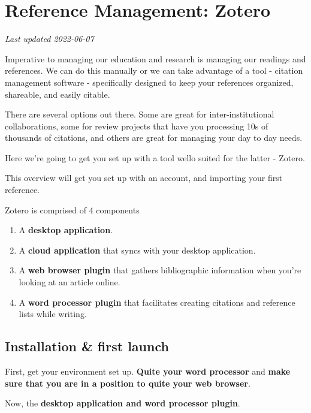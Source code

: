 \documentclass[
]{book}
\providecommand{\tightlist}{%
  \setlength{\itemsep}{0pt}\setlength{\parskip}{0pt}}
\begin{document}
\hypertarget{reference-management-zotero}{%
\chapter{Reference Management: Zotero}\label{reference-management-zotero}}

\emph{Last updated 2022-06-07}

Imperative to managing our education and research is managing our readings and references. We can do this manually or we can take advantage of a tool - citation management software - specifically designed to keep your references organized, shareable, and easily citable.

There are several options out there. Some are great for inter-institutional collaborations, some for review projects that have you processing 10s of thousands of citations, and others are great for managing your day to day needs.

Here we're going to get you set up with a tool wello suited for the latter - Zotero.

This overview will get you set up with an account, and importing your first reference.

Zotero is comprised of 4 components

\begin{enumerate}
\def\labelenumi{\arabic{enumi}.}
\tightlist
\item
  A \textbf{desktop application}.
\item
  A \textbf{cloud application} that syncs with your desktop application.
\item
  A \textbf{web browser plugin} that gathers bibliographic information when you're looking at an article online.
\item
  A \textbf{word processor plugin} that facilitates creating citations and reference lists while writing.
\end{enumerate}

\hypertarget{installation-first-launch}{%
\section{Installation \& first launch}\label{installation-first-launch}}

First, get your environment set up. \textbf{Quite your word processor} and \textbf{make sure that you are in a position to quite your web browser}.

Now, the \textbf{desktop application and word processor plugin}.
\end{document}
